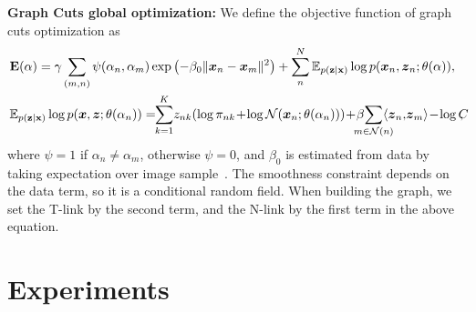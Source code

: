\documentclass{article}
\renewcommand{\vec}[1]{\boldsymbol{#1}}
\newcommand{\mat}[1]{\text{\bf #1}}
\begin{document}
\noindent \textbf{Graph Cuts global optimization: }We define the objective
function of graph cuts optimization as
\begin{align*}
  &\mat E(\alpha) = \gamma \sum_{(m,n)} \psi(\alpha_n, \alpha_m) \exp \left ( -\beta_0 \| \vec x_n - \vec x_m\|^2 \right ) +\sum_n^N \mathbb{E}_{p(\mat z|\mat x)} \log p(\vec x_n, \vec z_n; \theta (\alpha)),\\
  &\mathbb{E}_{p(\mat z|\mat x)} \log p(\vec x, \vec z; \theta (\alpha_n)) = \!\!\sum_{k=1}^K \!z_{nk}(\log \pi_{nk} \!+\! \log \mathcal{N}(\vec x_n; \theta(\alpha_n))) \!+\!  \beta \!\!\!\!\!\!\sum_{m \in \mathcal{N}(n)} \!\!\!\!\!\langle \vec z_n, \!\vec z_m\rangle \!-\! \log C \!\!\!\!,
\end{align*}
where $\psi = 1$ if $\alpha_n \neq \alpha_m$, otherwise $\psi = 0$, and
$\beta_0$ is estimated from data by taking expectation over image
sample~\cite{boykov2001fast,rother2004grabcut}. The smoothness constraint
depends on the data term, so it is a conditional random field. When building the
graph, we set the T-link by the second term, and the N-link by the first term in
the above equation.



\section{Experiments}



\end{document}
